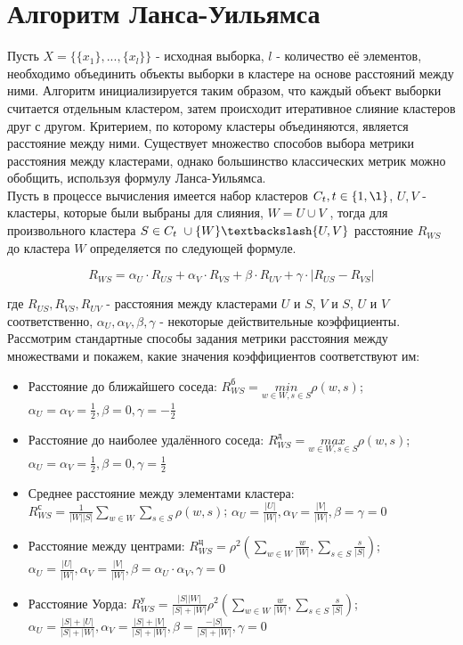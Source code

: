 \section*{Алгоритм Ланса-Уильямса}

Пусть $X = \{\{x_1\},..., \{x_l\}\}$ - исходная выборка, $l$ - количество её элементов, необходимо объединить объекты выборки в кластере на основе расстояний между ними. Алгоритм инициализируется таким образом, что каждый объект выборки считается отдельным кластером, затем происходит итеративное слияние кластеров друг с другом. Критерием, по которому кластеры объединяются, является расстояние между ними. %
Существует множество способов выбора метрики расстояния между кластерами, однако большинство классических метрик можно обобщить, используя формулу Ланса-Уильямса.\\
Пусть в процессе вычисления имеется набор кластеров $C_t,t \in \{1, \l\}$, $U, V$ - кластеры, которые были выбраны для слияния, $W = U \cup V$ , тогда для произвольного кластера $S \in C_t\ \cup \{W\} \textbackslash \{U, V\}$ расстояние $R_{WS}$ до кластера $W$ определяется по следующей формуле.

\begin{equation*}
    R_{WS} = \alpha_U \cdot R_{US} + \alpha_V \cdot R_{VS} + \beta \cdot R_{UV} + \gamma \cdot |R_{US} - R_{VS}|
\end{equation*}

где $R_{US}, R_{VS}, R_{UV}$ - расстояния между кластерами $U$ и $S$, $V$ и $S$, $U$ и $V$ соответственно, $\alpha_U, \alpha_V, \beta, \gamma$ - некоторые действительные коэффициенты. Рассмотрим стандартные способы задания метрики расстояния между множествами и покажем, какие значения коэффициентов соответствуют им:

\begin{itemize}
    \item Расстояние до ближайшего соседа: $R^{\text{б}}_{WS} = \underset{w \in W, s \in S}{min}
              \rho (w, s)$; $\alpha_U = \alpha_V = \frac{1}{2}, \beta = 0, \gamma = - \frac{1}{2}$
    \item Расстояние до наиболее удалённого соседа: $R^{\text{д}}_{WS} = \underset{w \in W, s \in S}{max} \rho (w, s)$; $\alpha_U = \alpha_V = \frac{1}{2}, \beta = 0, \gamma = \frac{1}{2}$
    \item Среднее расстояние между элементами кластера: $R^{\text {с}}_{WS} = \frac{1}{|W||S|} \sum_{w \in W} \sum_{s \in S} \rho (w, s)$; $\alpha_U = \frac{|U|}{|W|}, \alpha_V = \frac{|V|}{|W|}, \beta = \gamma = 0$
    \item Расстояние между центрами: $R^{\text{ц}}_{WS} = \rho^2 \left( \sum_{w \in W} \frac{w}{|W|}, \sum_{s \in S} \frac{s}{|S|} \right)$; $\alpha_U = \frac{|U|}{|W|}, \alpha_V = \frac{|V|}{|W|}, \beta = \alpha_U \cdot \alpha_V, \gamma = 0$
    \item Расстояние Уорда: $R^{\text{у}}_{WS} = \frac{|S||W|}{|S|+|W|} \rho^2 \left( \sum_{w \in W} \frac{w}{|W|}, \sum_{s \in S} \frac{s}{|S|} \right)$; $\alpha_U = \frac{|S| + |U|}{|S|+|W|}, \alpha_V = \frac{|S|+|V|}{|S|+|W|}, \beta = \frac{-|S|}{|S|+|W|}, \gamma = 0$
\end{itemize}

